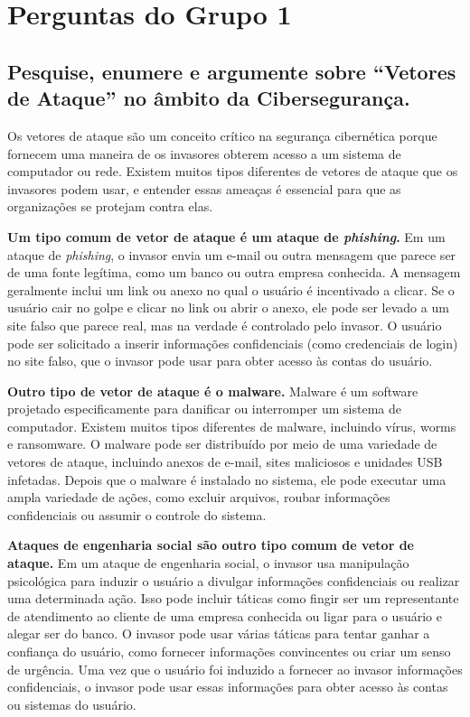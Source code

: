 \chapter{Perguntas do Grupo 1}

\section[Pergunta 1]{Pesquise, enumere e argumente sobre “Vetores de Ataque” no âmbito da Cibersegurança.}

Os vetores de ataque são um conceito crítico na segurança cibernética porque fornecem uma maneira de os invasores obterem acesso a um sistema de computador ou rede. Existem muitos tipos diferentes de vetores de ataque que os invasores podem usar, e entender essas ameaças é essencial para que as organizações se protejam contra elas.

\textbf{Um tipo comum de vetor de ataque é um ataque de \textit{phishing}.} Em um ataque de \textit{phishing}, o invasor envia um e-mail ou outra mensagem que parece ser de uma fonte legítima, como um banco ou outra empresa conhecida. A mensagem geralmente inclui um link ou anexo no qual o usuário é incentivado a clicar. Se o usuário cair no golpe e clicar no link ou abrir o anexo, ele pode ser levado a um site falso que parece real, mas na verdade é controlado pelo invasor. O usuário pode ser solicitado a inserir informações confidenciais (como credenciais de login) no site falso, que o invasor pode usar para obter acesso às contas do usuário.

\textbf{Outro tipo de vetor de ataque é o malware.} Malware é um software projetado especificamente para danificar ou interromper um sistema de computador. Existem muitos tipos diferentes de malware, incluindo vírus, worms e ransomware. O malware pode ser distribuído por meio de uma variedade de vetores de ataque, incluindo anexos de e-mail, sites maliciosos e unidades USB infetadas. Depois que o malware é instalado no sistema, ele pode executar uma ampla variedade de ações, como excluir arquivos, roubar informações confidenciais ou assumir o controle do sistema.

\textbf{Ataques de engenharia social são outro tipo comum de vetor de ataque.} Em um ataque de engenharia social, o invasor usa manipulação psicológica para induzir o usuário a divulgar informações confidenciais ou realizar uma determinada ação. Isso pode incluir táticas como fingir ser um representante de atendimento ao cliente de uma empresa conhecida ou ligar para o usuário e alegar ser do banco. O invasor pode usar várias táticas para tentar ganhar a confiança do usuário, como fornecer informações convincentes ou criar um senso de urgência. Uma vez que o usuário foi induzido a fornecer ao invasor informações confidenciais, o invasor pode usar essas informações para obter acesso às contas ou sistemas do usuário.

